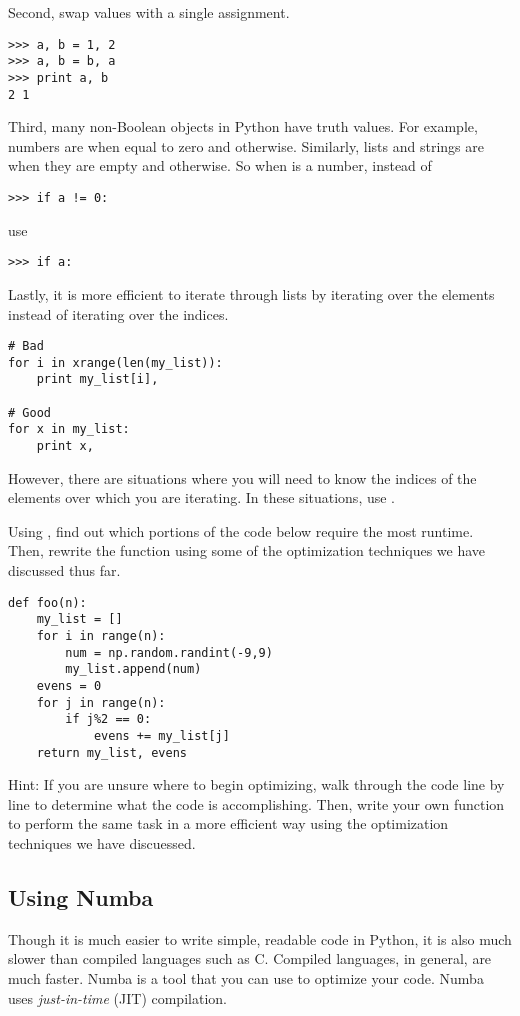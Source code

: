 Second, swap values with a single assignment.
\begin{lstlisting}
>>> a, b = 1, 2
>>> a, b = b, a
>>> print a, b
2 1
\end{lstlisting}

Third, many non-Boolean objects in Python have truth values.
For example, numbers are  when equal to zero and  otherwise.
Similarly, lists and strings are  when they are empty and  otherwise.
So when  is a number, instead of
\begin{lstlisting}
>>> if a != 0:
\end{lstlisting}
use
\begin{lstlisting}
>>> if a:
\end{lstlisting}

Lastly, it is more efficient to iterate through lists by iterating over the elements instead of iterating over the indices.
\begin{lstlisting}
# Bad
for i in xrange(len(my_list)):
    print my_list[i],

# Good
for x in my_list:
    print x,
\end{lstlisting}

However, there are situations where you will need to know the indices of the elements over which you are iterating. In these situations, use .

\begin{problem}
Using , find out which portions of the code below require the most runtime. Then, rewrite the function using some of the optimization techniques we have discussed thus far.
\begin{lstlisting}
def foo(n):
    my_list = []
    for i in range(n):
        num = np.random.randint(-9,9)
        my_list.append(num)
    evens = 0
    for j in range(n):
        if j%2 == 0:
            evens += my_list[j]
    return my_list, evens
\end{lstlisting}

Hint: If you are unsure where to begin optimizing, walk through the code line by line to determine what the code is accomplishing. Then, write your own function to perform the same task in a more efficient way using the optimization techniques we have discuessed.
\end{problem}

\subsection*{Using Numba}
Though it is much easier to write simple, readable code in Python, it is also much slower than compiled languages such as C. Compiled languages, in general, are much faster.
Numba is a tool that you can use to optimize your code. Numba uses \emph{just-in-time} (JIT) compilation.

